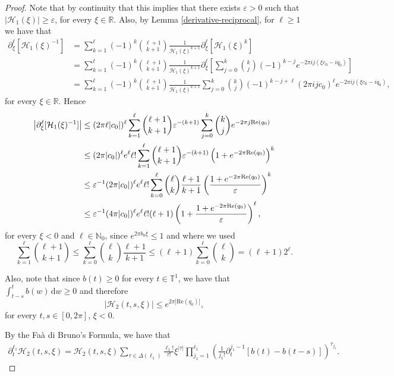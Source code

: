 \documentclass[10pt,a4paper]{amsart}
\newcommand{\N}{\mathbb{N}}
\newcommand{\R}{\mathbb{R}}
\newcommand{\Real}{\mathrm{Re}}
\newcommand{\T}{\mathbb{T}}
\begin{document}
\begin{proof}
Note that by continuity that this implies that there exists $\varepsilon>0$ such that $|\mathcal{H}_1(\xi)|\geq\varepsilon$, for every $\xi\in\R$. Also, by Lemma \ref{derivative-reciprocal}, for $\ell\geq 1$ we have that
    \begin{align*}
        \partial_\xi^{\ell}[\mathcal{H}_1(\xi)^{-1}]&=\sum_{k=1}^\ell(-1)^k\binom{\ell+1}{k+1}\frac{1}{\mathcal{H}_1(\xi)^{k+1}}\partial_\xi^\ell[\mathcal{H}_1(\xi)^k]\\
        &=\sum_{k=1}^\ell(-1)^k\binom{\ell+1}{k+1}\frac{1}{\mathcal{H}_1(\xi)^{k+1}}\partial_\xi^\ell\left[\sum_{j=0}^k\binom{k}{j}(-1)^{k-j}e^{-2\pi ij(\xi c_0-iq_0)}\right]\\
        &=\sum_{k=1}^\ell(-1)^k\binom{\ell+1}{k+1}\frac{1}{\mathcal{H}_1(\xi)^{k+1}}\sum_{j=0}^k\binom{k}{j}(-1)^{k-j+\ell}(2\pi i j c_0)^\ell e^{-2\pi ij(\xi c_0-iq_0)},
    \end{align*}
for every $\xi\in\R$. Hence 
        \begin{align}
        \left|\partial_\xi^{\ell}[\mathcal{H}_1(\xi)^{-1}]\right| & \leq(2\pi \ell |c_0|)^\ell\sum_{k=1}^\ell\binom{\ell+1}{k+1}\varepsilon^{-(k+1)}\sum_{j=0}^k\binom{k}{j} e^{-2\pi j \Real(q_0)} \notag \\
        &\leq (2\pi |c_0|)^\ell e^\ell \ell!\sum_{k=1}^\ell\binom{\ell+1}{k+1}\varepsilon^{-(k+1)}\left(1+e^{-2\pi  \Real(q_0)}\right)^k \notag \\
        &\leq \varepsilon^{-1}(2\pi |c_0|)^\ell e^\ell \ell!\sum_{k=0}^{\ell}\binom{\ell}{k}\frac{\ell+1}{k+1}\left(\frac{1+e^{-2\pi  \Real(q_0)}}{\varepsilon}\right)^k \notag \\
        & \leq \varepsilon^{-1}(4\pi |c_0|)^\ell e^\ell \ell!(\ell+1)\left(1+\frac{1+e^{-2\pi  \Real(q_0)}}{\varepsilon}\right)^\ell, \label{H1}
    \end{align}
    for every $\xi<0$ and $\ell\in\N_0$, since $e^{2\pi b_0\xi}\leq 1$ and where we used
    \[\sum_{k=1}^{\ell}\binom{\ell+1}{k+1}\leq \sum_{k=0}^{\ell}\binom{\ell}{k}\frac{\ell+1}{k+1}\leq (\ell+1)\sum_{k=0}^{\ell}\binom{\ell}{k} = (\ell+1)2^\ell.\]
    
    Also, note that since $b(t)\geq 0$ for every $t\in\T^1$, we have that $\int_{t-s}^tb(w)\,\mathrm{d}w\geq 0$ and therefore
    \begin{equation*}
        |\mathcal{H}_2(t,s,\xi)|\leq e^{2\pi|\Real(q_0)|},
    \end{equation*}
for every $t,s\in [0,2\pi]$, $\xi<0$.
    
By the Fa\`a di Bruno's Formula, we have that
    \begin{align}\label{H2_1}
    \partial_t^{\ell_1}\mathcal{H}_2(t,s,\xi) = \mathcal{H}_2(t,s,\xi)\sum_{\tau\in\Delta(\ell_1)}\frac{\ell_1!}{\tau!}\xi^{|\tau|}\prod_{j_1=1}^{\ell_1}\left(\frac{1}{j_1!}\partial_t^{j_1-1}[b(t)-b(t-s)]\right)^{\tau_{j_1}}. 
    \end{align}
    

\end{proof}
\end{document}
